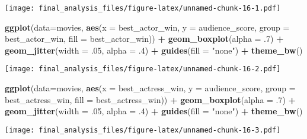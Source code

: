 \documentclass[]{article}
\newenvironment{Shaded}{\begin{snugshade}}{\end{snugshade}}
\newcommand{\KeywordTok}[1]{\textcolor[rgb]{0.13,0.29,0.53}{\textbf{#1}}}
\newcommand{\DataTypeTok}[1]{\textcolor[rgb]{0.13,0.29,0.53}{#1}}
\newcommand{\DecValTok}[1]{\textcolor[rgb]{0.00,0.00,0.81}{#1}}
\newcommand{\StringTok}[1]{\textcolor[rgb]{0.31,0.60,0.02}{#1}}
\newcommand{\OperatorTok}[1]{\textcolor[rgb]{0.81,0.36,0.00}{\textbf{#1}}}
\newcommand{\NormalTok}[1]{#1}
\begin{document}
\texttt{[image: final\_analysis\_files/figure-latex/unnamed-chunk-16-1.pdf]}

\begin{Shaded}
\begin{Highlighting}[]
\KeywordTok{ggplot}\NormalTok{(}\DataTypeTok{data=}\NormalTok{movies, }\KeywordTok{aes}\NormalTok{(}\DataTypeTok{x =}\NormalTok{ best_actor_win, }\DataTypeTok{y =}\NormalTok{ audience_score, }\DataTypeTok{group =}\NormalTok{ best_actor_win, }\DataTypeTok{fill =}\NormalTok{ best_actor_win)) }\OperatorTok{+}\StringTok{ }\KeywordTok{geom_boxplot}\NormalTok{(}\DataTypeTok{alpha =}\NormalTok{ .}\DecValTok{7}\NormalTok{) }\OperatorTok{+}\StringTok{ }\KeywordTok{geom_jitter}\NormalTok{(}\DataTypeTok{width =}\NormalTok{ .}\DecValTok{05}\NormalTok{, }\DataTypeTok{alpha =}\NormalTok{ .}\DecValTok{4}\NormalTok{) }\OperatorTok{+}\StringTok{ }\KeywordTok{guides}\NormalTok{(}\DataTypeTok{fill =} \StringTok{"none"}\NormalTok{) }\OperatorTok{+}\StringTok{ }\KeywordTok{theme_bw}\NormalTok{()}
\end{Highlighting}
\end{Shaded}

\texttt{[image: final\_analysis\_files/figure-latex/unnamed-chunk-16-2.pdf]}

\begin{Shaded}
\begin{Highlighting}[]
\KeywordTok{ggplot}\NormalTok{(}\DataTypeTok{data=}\NormalTok{movies, }\KeywordTok{aes}\NormalTok{(}\DataTypeTok{x =}\NormalTok{ best_actress_win, }\DataTypeTok{y =}\NormalTok{ audience_score, }\DataTypeTok{group =}\NormalTok{ best_actress_win, }\DataTypeTok{fill =}\NormalTok{ best_actress_win)) }\OperatorTok{+}\StringTok{ }\KeywordTok{geom_boxplot}\NormalTok{(}\DataTypeTok{alpha =}\NormalTok{ .}\DecValTok{7}\NormalTok{) }\OperatorTok{+}\StringTok{ }\KeywordTok{geom_jitter}\NormalTok{(}\DataTypeTok{width =}\NormalTok{ .}\DecValTok{05}\NormalTok{, }\DataTypeTok{alpha =}\NormalTok{ .}\DecValTok{4}\NormalTok{) }\OperatorTok{+}\StringTok{ }\KeywordTok{guides}\NormalTok{(}\DataTypeTok{fill =} \StringTok{"none"}\NormalTok{) }\OperatorTok{+}\StringTok{ }\KeywordTok{theme_bw}\NormalTok{()}
\end{Highlighting}
\end{Shaded}

\texttt{[image: final\_analysis\_files/figure-latex/unnamed-chunk-16-3.pdf]}
\end{document}
